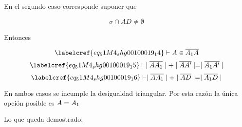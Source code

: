 En el segundo caso corresponde suponer que

\begin{equation} \label{eq_51M4_shg00100019_14}
	\sigma \cap AD \neq \emptyset
\end{equation}

Entonces 

\begin{equation} \label{eq_51M4_shg00100019_15}
	\labelcref{eq_51M4_shg00100019_14} \vdash A \in \overline{A\textsubscript{1}A}
\end{equation}
\begin{equation} \label{eq_51M4_shg00100019_16}
	\labelcref{eq_51M4_shg00100019_15} \vdash \mid\overline{AA\textsubscript{1}}\mid + \mid\overline{AA'}\mid = \mid\overline{A\textsubscript{1}A'}\mid
\end{equation}
\begin{equation} \label{eq_51M4_shg00100019_17}
	\labelcref{eq_51M4_shg00100019_16} \vdash \mid\overline{AA\textsubscript{1}}\mid + \mid\overline{AD}\mid = \mid\overline{A\textsubscript{1}D}\mid
\end{equation}

En ambos casos se incumple la desigualdad triangular. Por esta razón la única opción posible es $A = A\textsubscript{1}$

\vspace{1cm}
Lo que queda demostrado. \\\\\\
